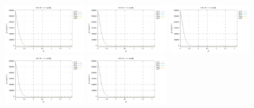 \noindent
\includegraphics[width=3.5cm]{python_codes/fieldstone_152/RESULTS/exp2/qqq_32_m2}
\includegraphics[width=3.5cm]{python_codes/fieldstone_152/RESULTS/exp2/qqq_32_m3}
\includegraphics[width=3.5cm]{python_codes/fieldstone_152/RESULTS/exp2/qqq_32_m4}
\includegraphics[width=3.5cm]{python_codes/fieldstone_152/RESULTS/exp2/qqq_32_m5}
\includegraphics[width=3.5cm]{python_codes/fieldstone_152/RESULTS/exp2/qqq_32_m6}

